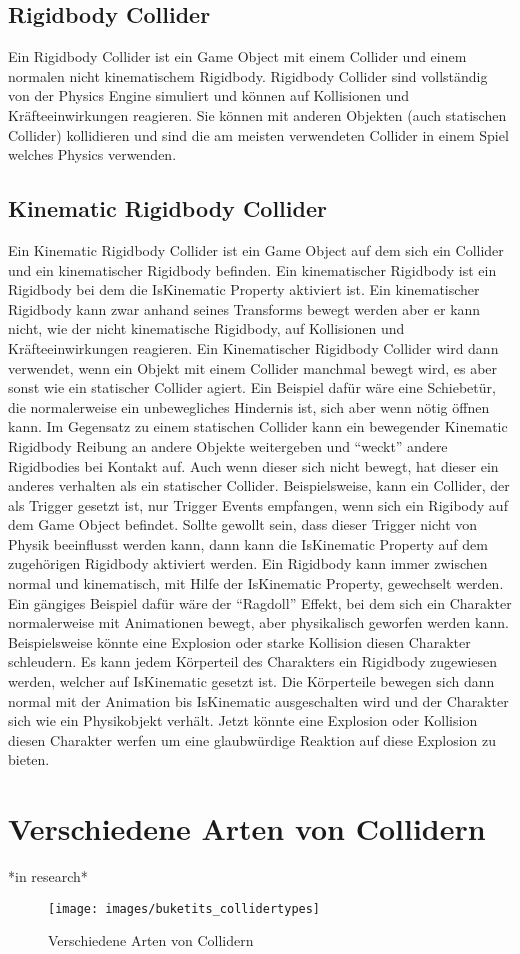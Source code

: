 \subsection{Rigidbody Collider}
Ein Rigidbody Collider ist ein Game Object mit einem Collider und einem normalen nicht kinematischem Rigidbody. Rigidbody Collider sind vollständig von der Physics Engine simuliert und können auf Kollisionen und Kräfteeinwirkungen reagieren. Sie können mit anderen Objekten (auch statischen Collider) kollidieren und sind die am meisten verwendeten Collider in einem Spiel welches Physics verwenden.

\subsection{Kinematic Rigidbody Collider}
Ein Kinematic Rigidbody Collider ist ein Game Object auf dem sich ein Collider und ein kinematischer Rigidbody befinden. Ein kinematischer Rigidbody ist ein Rigidbody bei dem die IsKinematic Property aktiviert ist. Ein kinematischer Rigidbody kann zwar anhand seines Transforms bewegt werden aber er kann nicht, wie der nicht kinematische Rigidbody, auf Kollisionen und Kräfteeinwirkungen reagieren. Ein Kinematischer Rigidbody Collider wird dann verwendet, wenn ein Objekt mit einem Collider manchmal bewegt wird, es aber sonst wie ein statischer Collider agiert.
Ein Beispiel dafür wäre eine Schiebetür, die normalerweise ein unbewegliches Hindernis ist, sich aber wenn nötig öffnen kann. Im Gegensatz zu einem statischen Collider kann ein bewegender Kinematic Rigidbody Reibung an andere Objekte weitergeben und "`weckt"' andere Rigidbodies bei Kontakt auf.
Auch wenn dieser sich nicht bewegt, hat dieser ein anderes verhalten als ein statischer Collider. Beispielsweise, kann ein Collider, der als Trigger gesetzt ist, nur Trigger Events empfangen, wenn sich ein Rigibody auf dem Game Object befindet. Sollte gewollt sein, dass dieser Trigger nicht von Physik beeinflusst werden kann, dann kann die IsKinematic Property auf dem zugehörigen Rigidbody aktiviert werden. Ein Rigidbody kann immer zwischen normal und kinematisch, mit Hilfe der IsKinematic Property, gewechselt werden. Ein gängiges Beispiel dafür wäre der "`Ragdoll"' Effekt, bei dem sich ein Charakter normalerweise mit Animationen bewegt, aber physikalisch geworfen werden kann. Beispielsweise könnte eine Explosion oder starke Kollision diesen Charakter schleudern. Es kann jedem Körperteil des Charakters ein Rigidbody zugewiesen werden, welcher auf IsKinematic gesetzt ist. Die Körperteile bewegen sich dann normal mit der Animation bis IsKinematic ausgeschalten wird und der Charakter sich wie ein Physikobjekt verhält. Jetzt könnte eine Explosion oder Kollision diesen Charakter werfen um eine glaubwürdige Reaktion auf diese Explosion zu bieten.
\cite{_staticCollider}

\section{Verschiedene Arten von Collidern}
*in research*
\begin{figure}[H]
	\centering
	\texttt{[image: images/buketits\_collidertypes]}
	\caption{Verschiedene Arten von Collidern}
\end{figure}
\cite{dickinson2015unity}
